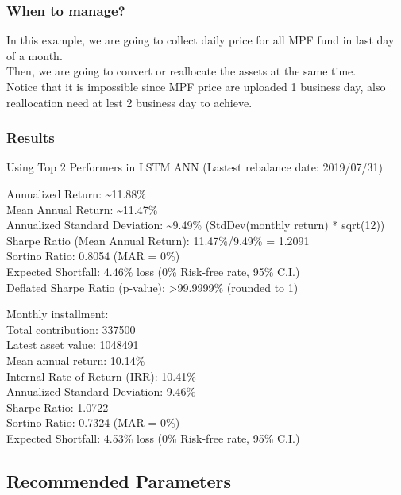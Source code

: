 \documentclass[]{article}
\begin{document}
\hypertarget{when-to-manage}{%
\subsubsection{When to manage?}\label{when-to-manage}}

In this example, we are going to collect daily price for all MPF fund in
last day of a month.\\
Then, we are going to convert or reallocate the assets at the same
time.\\
Notice that it is impossible since MPF price are uploaded 1 business
day, also reallocation need at lest 2 business day to achieve.

\hypertarget{results}{%
\subsubsection{Results}\label{results}}

Using Top 2 Performers in LSTM ANN (Lastest rebalance date: 2019/07/31)

Annualized Return: \textasciitilde{}11.88\%\\
Mean Annual Return: \textasciitilde{}11.47\%\\
Annualized Standard Deviation: \textasciitilde{}9.49\% (StdDev(monthly
return) * sqrt(12))\\
Sharpe Ratio (Mean Annual Return): 11.47\%/9.49\% = 1.2091\\
Sortino Ratio: 0.8054 (MAR = 0\%)\\
Expected Shortfall: 4.46\% loss (0\% Risk-free rate, 95\% C.I.)\\
Deflated Sharpe Ratio (p-value): \textgreater{}99.9999\% (rounded to 1)

Monthly installment:\\
Total contribution: 337500\\
Latest asset value: 1048491\\
Mean annual return: 10.14\%\\
Internal Rate of Return (IRR): 10.41\%\\
Annualized Standard Deviation: 9.46\%\\
Sharpe Ratio: 1.0722\\
Sortino Ratio: 0.7324 (MAR = 0\%)\\
Expected Shortfall: 4.53\% loss (0\% Risk-free rate, 95\% C.I.)

\hypertarget{recommended-parameters}{%
\subsection{Recommended Parameters}\label{recommended-parameters}}
\end{document}
